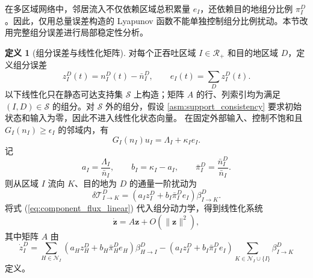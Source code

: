 \documentclass[a4paper,12pt]{article}
\theoremstyle{plain}
\theoremstyle{definition}
\newtheorem{definition}[theorem]{定义}
\theoremstyle{remark}
\begin{document}
在多区域网络中，邻居流入不仅依赖区域总积累量 $e_I$，还依赖目的地组分比例 $\pi_I^D$。因此，仅用总量误差构造的 Lyapunov 函数不能单独控制组分比例扰动。本节改用完整组分误差进行局部稳定性分析。

\begin{definition}[组分误差与线性化矩阵]\label{def:component_jacobian}
对每个正吞吐区域 $I\in\mathcal R_+$ 和目的地区域 $D$，定义组分误差
\begin{equation}
    z_I^D(t)=n_I^D(t)-\bar n_I^D,\qquad e_I(t)=\sum_D z_I^D(t).
\end{equation}
以下线性化只在静态可达支持集 $\mathcal S$ 上构造；矩阵 $A$ 的行、列索引均为满足 $(I,D)\in\mathcal S$ 的组分。对 $\mathcal S$ 外的组分，假设 \ref{asm:support_consistency} 要求初始状态和输入为零，因此不进入线性化状态向量。
在固定外部输入、控制不饱和且 $G_I(n_I)\ge\epsilon_I$ 的邻域内，有
\begin{equation}
    G_I(n_I)u_I=\Lambda_I+\kappa_I e_I .
\end{equation}
记
\begin{equation}
    a_I=\frac{\Lambda_I}{\bar n_I},\qquad b_I=\kappa_I-a_I,\qquad
    \bar\pi_I^D=\frac{\bar n_I^D}{\bar n_I}.
\end{equation}
则从区域 $I$ 流向 $K$、目的地为 $D$ 的通量一阶扰动为
\begin{equation}\label{eq:component_flux_linear}
    \delta \mathcal T_{I\to K}^D
    =
    \left(a_I z_I^D+b_I\bar\pi_I^D e_I\right)\beta_{I\to K}^D .
\end{equation}
将式 (\ref{eq:component_flux_linear}) 代入组分动力学，得到线性化系统
\begin{equation}\label{eq:component_linear_system}
    \dot{\bm z}=A\bm z+O(\|\bm z\|^2),
\end{equation}
其中矩阵 $A$ 由
\begin{equation}\label{eq:component_jacobian}
    \dot z_I^D
    =
    \sum_{H\in\mathcal N_I}
    \left(a_H z_H^D+b_H\bar\pi_H^D e_H\right)\beta_{H\to I}^D
    -
    \left(a_I z_I^D+b_I\bar\pi_I^D e_I\right)
    \sum_{K\in\mathcal N_I\cup\{I\}}\beta_{I\to K}^D
\end{equation}
定义。
\end{definition}
\end{document}
